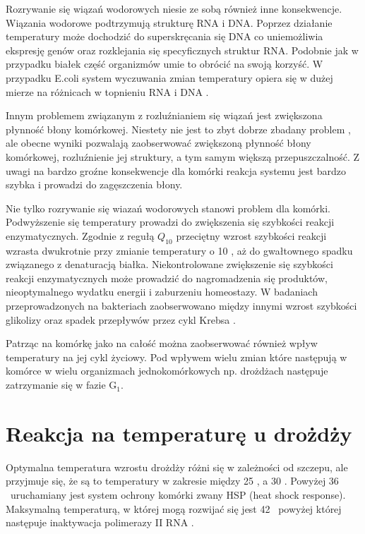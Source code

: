\documentclass{pracamgr}
\begin{document}
Rozrywanie się wiązań wodorowych niesie ze sobą również inne konsekwencje. Wiązania wodorowe podtrzymują strukturę RNA i DNA. Poprzez działanie temperatury może dochodzić do superskręcania się DNA co uniemożliwia 
ekspresję genów oraz rozklejania się specyficznych struktur RNA. Podobnie jak w przypadku białek część organizmów umie to obrócić na swoją korzyść. W przypadku E.coli system wyczuwania zmian temperatury opiera się
w dużej mierze na różnicach w topnieniu RNA i DNA \cite{TsInEubact, Digel08}.

Innym problemem związanym z rozluźnianiem się wiązań jest zwiększona płynność błony komórkowej. Niestety nie jest to zbyt dobrze zbadany problem \cite{Membranefluidity}, ale obecne wyniki pozwalają zaobserwować zwiększoną
płynność błony komórkowej, rozluźnienie jej struktury, a tym samym większą przepuszczalność. Z uwagi na bardzo groźne konsekwencje dla komórki reakcja systemu jest bardzo szybka i prowadzi do zagęszczenia błony.

Nie tylko rozrywanie się wiazań wodorowych stanowi problem dla komórki. Podwyższenie się temperatury prowadzi do zwiększenia się szybkości reakcji enzymatycznych. Zgodnie z regułą $Q_{10}$ przeciętny wzrost
szybkości reakcji wzrasta dwukrotnie przy zmianie temperatury o 10 \textcelsius, aż do gwałtownego spadku związanego z denaturacją białka. Niekontrolowane zwiększenie się szybkości reakcji enzymatycznych
może prowadzić do nagromadzenia się produktów, nieoptymalnego wydatku energii i zaburzeniu homeostazy. W badaniach przeprowadzonych na bakteriach zaobserwowano między innymi wzrost szybkości glikolizy oraz spadek przepływów przez 
cykl Krebsa \cite{Wittmann07}.

Patrząc na komórkę jako na całość można zaobserwować również wpływ temperatury na jej cykl życiowy. Pod wpływem wielu zmian które następują w komórce w wielu organizmach jednokomórkowych np. drożdżach 
następuje zatrzymanie się w fazie G$_1$.

\section{Reakcja na temperaturę u drożdży}

Optymalna temperatura wzrostu drożdży różni się w zależności od szczepu, ale przyjmuje się, że są to temperatury w 
zakresie między 25 \textcelsius, a 30 \textcelsius. Powyżej 36 \textcelsius\ uruchamiany jest system ochrony komórki
zwany HSP (heat shock response). Maksymalną temperaturą, w której mogą rozwijać się jest 42 \textcelsius\ powyżej której 
następuje inaktywacja polimerazy II RNA \cite{Morano12}.
\end{document}
